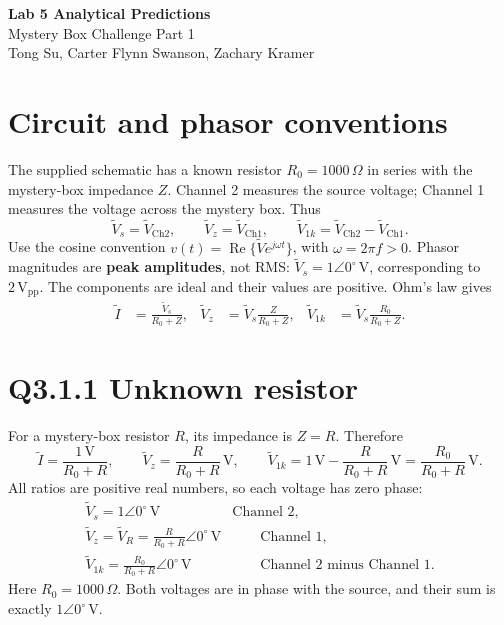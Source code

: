 \documentclass[11pt,letterpaper]{article}
\newcommand{\Vs}{\widetilde V_s}
\newcommand{\Vz}{\widetilde V_z}
\newcommand{\Vk}{\widetilde V_{1k}}
\begin{document}
\begin{center}
{\Large\bfseries Lab 5 Analytical Predictions}\\[5pt]
Mystery Box Challenge Part 1\\
Tong Su, Carter Flynn Swanson, Zachary Kramer
\end{center}
\section*{Circuit and phasor conventions}
The supplied schematic has a known resistor $R_0=1000\,\Omega$ in series
with the mystery-box impedance $Z$. Channel 2 measures the source voltage;
Channel 1 measures the voltage across the mystery box. Thus
\[
\Vs=\widetilde V_{\mathrm{Ch2}},\qquad
\Vz=\widetilde V_{\mathrm{Ch1}},\qquad
\Vk=\widetilde V_{\mathrm{Ch2}}-\widetilde V_{\mathrm{Ch1}}.
\]
Use the cosine convention $v(t)=\operatorname{Re}\{\widetilde V e^{j\omega t}\}$,
with $\omega=2\pi f>0$. Phasor magnitudes are \textbf{peak amplitudes}, not RMS:
$\Vs=1\angle0^\circ\,\mathrm V$, corresponding to $2\,\mathrm{V_{pp}}$.
The components are ideal and their values are positive. Ohm's law gives
\begin{align}
\widetilde I&=\frac{\Vs}{R_0+Z}, &
\Vz&=\Vs\frac{Z}{R_0+Z}, &
\Vk&=\Vs\frac{R_0}{R_0+Z}. \label{eq:divider}
\end{align}
\section*{Q3.1.1 Unknown resistor}
For a mystery-box resistor $R$, its impedance is $Z=R$. Therefore
\[
\widetilde I=\frac{1\,\mathrm V}{R_0+R},\qquad
\Vz=\frac{R}{R_0+R}\,\mathrm V,\qquad
\Vk=1\,\mathrm V-\frac{R}{R_0+R}\,\mathrm V
       =\frac{R_0}{R_0+R}\,\mathrm V.
\]
All ratios are positive real numbers, so each voltage has zero phase:
\begin{align*}
\boxed{\Vs=1\angle0^\circ\,\mathrm V}\qquad &\text{Channel 2},\\[7pt]
\boxed{\Vz=\widetilde V_R=\frac{R}{R_0+R}\angle0^\circ\,\mathrm V}
&\qquad\text{Channel 1},\\[7pt]
\boxed{\Vk=\frac{R_0}{R_0+R}\angle0^\circ\,\mathrm V}
&\qquad\text{Channel 2 minus Channel 1}.
\end{align*}
Here $R_0=1000\,\Omega$. Both voltages are in phase with the source,
and their sum is exactly $1\angle0^\circ\,\mathrm V$.

\newpage
\end{document}
